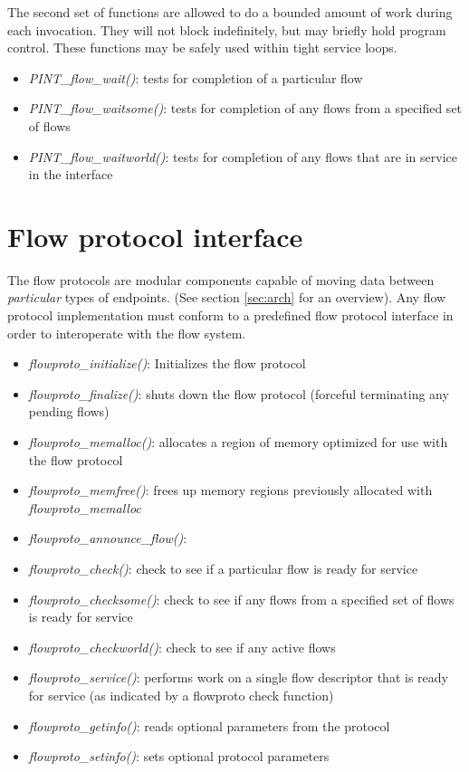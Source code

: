 \documentclass[12pt]{article} %
\begin{document}
The second set of functions are allowed to do a bounded amount of work
during each invocation.  They will not block indefinitely, but may
briefly hold program control.  These functions may be safely used
within tight service loops.

\begin{itemize}
	\item \emph{PINT\_flow\_wait()}: tests for completion of a particular
	flow
	\item \emph{PINT\_flow\_waitsome()}: tests for completion of any
	flows from a specified set of flows
	\item \emph{PINT\_flow\_waitworld()}: tests for completion of any
	flows that are in service in the interface
\end{itemize}

\section{Flow protocol interface}

The flow protocols are modular components capable of moving data between
\emph{particular} types of endpoints.  (See section \ref{sec:arch} for an
overview).  Any flow protocol implementation must conform to a
predefined flow protocol interface in order to interoperate with the
flow system.  

\begin{itemize}

	\item \emph{flowproto\_initialize()}: Initializes the flow
	protocol
	\item \emph{flowproto\_finalize()}: shuts down the flow
	protocol (forceful terminating any pending flows)
	\item \emph{flowproto\_memalloc()}: allocates a region of
	memory optimized for use with the flow protocol
	\item \emph{flowproto\_memfree()}: frees up memory regions
	previously allocated with \emph{flowproto\_memalloc}
	\item \emph{flowproto\_announce\_flow()}:
	\item \emph{flowproto\_check()}: check to see if a particular
	flow is ready for service
	\item \emph{flowproto\_checksome()}: check to see if any flows
	from a specified set of flows is ready for service
	\item \emph{flowproto\_checkworld()}: check to see if any
	active flows
	\item \emph{flowproto\_service()}: performs work on a single
	flow descriptor that is ready for service (as indicated by a
	flowproto check function)
	\item \emph{flowproto\_getinfo()}: reads optional parameters
	from the protocol
	\item \emph{flowproto\_setinfo()}: sets optional protocol
	parameters
\end{itemize}
\end{document}
